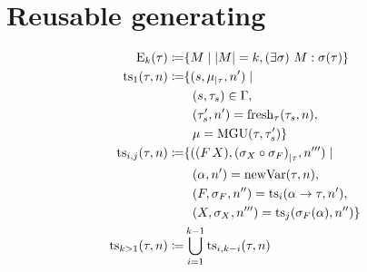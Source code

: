 \documentclass[a4paper,oneside]{memoir}
\begin{document}
\newcommand{\U}[2]{\op{U}(#1,#2)}
\newcommand{\Utt}{\U{\tau}{\tauPr}}
\newcommand{\MGUtt}{\MGU{\tau}{\tauPr}}

\newcommand{\e}[2]{\op{E}_{#1}(#2)}
\newcommand{\restrict}[2]{{#1}_{\mid #2}}
\newcommand{\fresh}[2]{\op{fresh}_{#1}(#2)}
\newcommand{\newVar}[1]{\op{newVar}(#1)}
\newcommand{\Ss}[1]{\op{ss}(#1)}
\newcommand{\TS}[2]{\op{ts}_{#1}(#2)}
\newcommand{\ts}[2]{\op{ts}_{#1}(#2)}
\newcommand{\TSij}[3]{\op{ts}_{#1,#2}(#3)}
\newcommand{\trees}[2]{\op{trees}_{#1}(#2)}
\newcommand{\FX}{\ap{F}{X}}
\newcommand{\sF}{\s_{F}}
\newcommand{\sX}{\s_{X}}
\newcommand{\vars}[1]{\op{vars}(#1)}
\newcommand{\dom}[1]{\op{dom}(#1)}
\newcommand{\IH}{induction hypothesis\xspace}
\newcommand{\discup}{~\mathbin{\dot{\cup}}~}



\section{Reusable generating}

\begin{definition}
\begin{align*}
\e{k}{\tau} \defi& \{ M \mid \abs{M} = k, \E{\s}{ M : \s(\tau) } \} \\
\ts{1}{\tau,n} \defi&  \{ (s,\restrict{\mu}{\tau}, \nPr) \mid \\
 & ~~ (s,\tau_s) \in \Gamma, \\
 & ~~ (\tausPr,\nPr) = \fresh{\tau}{\tau_s, n}, \\
 & ~~ \mu = \mgu{\tau,\tausPr}
\} \\
\ts{i,j}{\tau,n} \defi& \{ (\FX, \restrict{(\sX \circ \sF)}{\tau}, \nPrrr) \mid \\ 
  & ~~ (\alpha, \nPr) = \newVar{\tau,n}, \\
  & ~~ (F,\sF,\nPrr) = \ts{i}{\alpha \ar \tau,\nPr}, \\
  & ~~ (X,\sX,\nPrrr) = \ts{j}{\sF(\alpha), \nPrr} 
\} \\
\ts{k > 1}{\tau,n} \defi& \bigcup\limits_{i=1}^{k-1}  \TSij{i}{k-i}{\tau, n}
\end{align*}
\end{definition}
\end{document}
